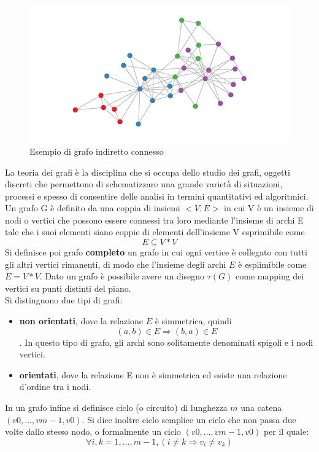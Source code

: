 {\begin{figure}[!htb]
	\begin{center}
		\includegraphics[width=0.7 \linewidth]{figure/grafoGenerico}
	\end{center}
	\caption{Esempio di grafo indiretto connesso \label{fig:grafoGenerico}}
\end{figure}
La teoria dei grafi è la disciplina che si occupa dello studio dei grafi, oggetti discreti che permettono di schematizzare una grande varietà di situazioni, processi e spesso di consentire delle analisi in termini quantitativi ed algoritmici. 
Un grafo G è definito da una coppia di insiemi \textbf{$<V,E>$} in cui V è un insieme di nodi o vertici che possono essere connessi tra loro mediante l'insieme di archi E tale che i suoi elementi siano coppie di elementi dell'insieme V esprimibile come
 $$E \subseteq V * V$$ 
Si definisce poi grafo \textbf{completo} un grafo in cui ogni vertice è collegato con tutti gli altri vertici rimanenti, di modo che l'insieme degli archi $E$ è esplimibile come $E= V * V$.
Dato un grafo è possibile avere un disegno $\tau(G)$ come mapping dei vertici su punti distinti del piano.\\
Si distinguono due tipi di grafi:
\begin{itemize}
	\item \textbf{non orientati}, dove la relazione $E$ è simmetrica, quindi $$(a,b) \in E \Rightarrow (b,a) \in E$$. In questo tipo di grafo, gli archi sono solitamente denominati spigoli e i nodi vertici.
	\item \textbf{orientati}, dove la relazione E non è simmetrica ed esiste una relazione d'ordine tra i nodi.
\end{itemize}
In un grafo infine si definisce ciclo (o circuito) di lunghezza $m$ una catena $(v0, ..., vm-1, v0)$.
Si dice inoltre ciclo semplice un ciclo che non passa due volte dallo stesso nodo, o formalmente un ciclo $(v0, ..., vm-1, v0)$ per il quale:
$$\forall i,k=1,...,m-1,(i\neq k\Rightarrow v_{i}\neq v_{k})$$

}
